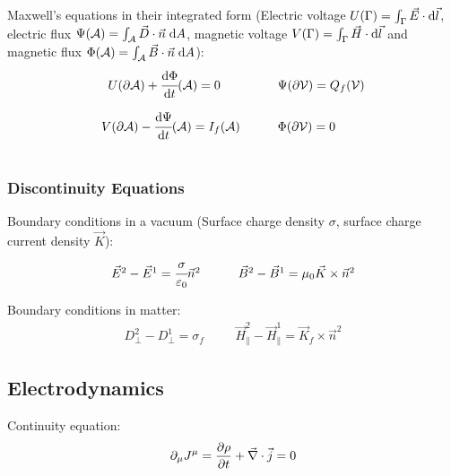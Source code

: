 		\noindent
		Maxwell's equations in their integrated form (Electric voltage $U(\Gamma)=\int_\Gamma \vec{E}\cdot\mathrm{d}\vec{l}$, electric flux $\Psi(\mathcal{A})=\int_\mathcal{A}\vec{D}\cdot\vec{n}\;\mathrm{d} A$, magnetic voltage $V(\Gamma)=\int_\Gamma \vec{H}\cdot\mathrm{d}\vec{l}$ and magnetic flux $\Phi(\mathcal{A})=\int_\mathcal{A}\vec{B}\cdot\vec{n}\;\mathrm{d} A$):
		\begin{equation}
		\begin{array}{rl}
			U(\partial \mathcal{A}) + \cfrac{\diff\Phi}{\diff t}(\mathcal{A}) = 0\phantom{(\mathcal{A})}
			&\hspace{20pt} \Psi(\partial\mathcal{V}) = Q_f(\mathcal{V}) \\ \xrowht{40pt}
			V(\partial \mathcal{A}) - \cfrac{\diff \Psi}{\diff t}(\mathcal{A}) = I_f(\mathcal{A})
			&\hspace{20pt} \Phi(\partial\mathcal{V}) = 0 \\
		\end{array}
		\end{equation}

		\subsubsection{Discontinuity Equations}
			\noindent
			Boundary conditions in a vacuum (Surface charge density $\sigma$, surface charge current density $\vec{K}$):
		\begin{equation}
		\begin{array}{cc}
			\vec{E}^2 - \vec{E}^1 = \cfrac{\sigma}{\varepsilon_0}\Vec{n}^2
			&\hspace{20pt} \vec{B}^2 - \vec{B}^1 = \mu_0\vec{K}\times\Vec{n}^2
		\end{array}
		\end{equation}

			\noindent
			Boundary conditions in matter:
		\begin{equation}
		\begin{array}{cc}
			D_\perp^2 - D_\perp^1 = \sigma_f
			&\hspace{20pt} \vec{H}_\parallel^2 - \vec{H}_\parallel^1 = \vec{K}_f\times\Vec{n}^2
		\end{array}
		\end{equation}

	\subsection{Electrodynamics}
		\noindent
		Continuity equation:
		\begin{equation}
			\partial_\mu J^\mu = \frac{\partial \rho}{\partial t} + \vec{\nabla}\cdot\vec{j} = 0
		\end{equation}

